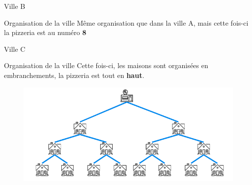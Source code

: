 \documentclass[10pt,xcolor=dvipsnames]{beamer}
\begin{document}
\begin{frame}{Ville B}
\begin{exampleblock}{Organisation de la ville}
Même organisation que dans la ville A, mais cette fois-ci la pizzeria est au numéro \textbf{8}
\end{exampleblock}
    
\end{frame}

\begin{frame}{Ville C}
\begin{exampleblock}{Organisation de la ville}
Cette fois-ci, les maisons sont organisées en embranchements, la pizzeria est tout en \textbf{haut}.
\end{exampleblock}
        \begin{figure}
        \centering
        \includegraphics[scale=0.40]{figures/CM0/Pizzeria-4.png}

        \label{fig:piz4}
    \end{figure}
    
    \begin{center}
    \end{center}
\end{frame}
\end{document}

